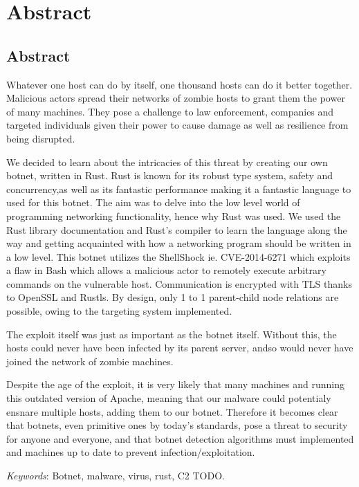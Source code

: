 \documentclass[../main.tex]{subfiles}
\begin{document}
    \newpage

	\chapter*{Abstract}

    \section*{Abstract}

Whatever one host can do by itself, one thousand hosts can do it better together. Malicious actors spread their networks of zombie hosts to grant them the power of many machines.
They pose a challenge to law enforcement, companies and targeted individuals given their power to cause damage as well as resilience from being disrupted.

We decided to learn about the intricacies of this threat by creating our own botnet, written in Rust. Rust is known for its robust type system, safety and concurrency,as well as its
fantastic performance making it a fantastic language to used for this botnet.
The aim was to delve into the low level world of programming networking functionality, hence why Rust was used. We used the Rust library documentation and Rust's compiler to learn
the language along the way and getting acquainted with how a networking program should be written in a low level.
This botnet utilizes the ShellShock ie. CVE-2014-6271 which exploits a flaw in Bash which allows a malicious actor to remotely execute arbitrary commands on the vulnerable host.
Communication is encrypted with TLS thanks to OpenSSL and Rustls. By design, only 1 to 1 parent-child node relations are possible, owing to the targeting system implemented.

The exploit itself was just as important as the botnet itself. Without this, the hosts could never have been infected by its parent server, andso would never have joined the network
of zombie machines.

Despite the age of the exploit, it is very likely that many machines and running this outdated version of Apache, meaning that our malware could potentialy ensnare multiple hosts,
adding them to our botnet. Therefore it becomes clear that botnets, even primitive ones by today's standards, pose a threat to security for anyone and everyone, and that botnet
detection algorithms must implemented and machines up to date to prevent infection/exploitation.


	\qquad \textit{Keywords}: Botnet, malware, virus, rust, C2 TODO.


	\vspace{10pt}
\end{document}
